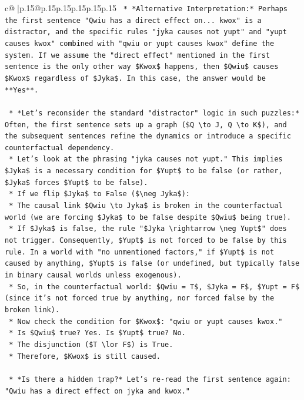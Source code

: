 \documentclass{article}
\begin{document}
{\begin{supertabular}{c@{$\;$}|p{.15\linewidth}@{}p{.15\linewidth}p{.15\linewidth}p{.15\linewidth}p{.15\linewidth}p{.15\linewidth}}
{{{\texttt{        *   *Alternative Interpretation:* Perhaps the first sentence "Qwiu has a direct effect on... kwox" is a distractor, and the specific rules "jyka causes not yupt" and "yupt causes kwox" combined with "qwiu or yupt causes kwox" define the system. If we assume the "direct effect" mentioned in the first sentence is the only other way \$Kwox\$ happens, then \$Qwiu\$ causes \$Kwox\$ regardless of \$Jyka\$. In this case, the answer would be **Yes**.} \\
\\ 
\texttt{    *   *Let's reconsider the standard "distractor" logic in such puzzles:* Often, the first sentence sets up a graph (\$Q \textbackslash{}to J, Q \textbackslash{}to K\$), and the subsequent sentences refine the dynamics or introduce a specific counterfactual dependency.} \\
\texttt{    *   Let's look at the phrasing "jyka causes not yupt." This implies \$Jyka\$ is a necessary condition for \$Yupt\$ to be false (or rather, \$Jyka\$ forces \$Yupt\$ to be false).} \\
\texttt{    *   If we flip \$Jyka\$ to False (\$\textbackslash{}neg Jyka\$):} \\
\texttt{        *   The causal link \$Qwiu \textbackslash{}to Jyka\$ is broken in the counterfactual world (we are forcing \$Jyka\$ to be false despite \$Qwiu\$ being true).} \\
\texttt{        *   If \$Jyka\$ is false, the rule "\$Jyka \textbackslash{}rightarrow \textbackslash{}neg Yupt\$" does not trigger. Consequently, \$Yupt\$ is not forced to be false by this rule. In a world with "no unmentioned factors," if \$Yupt\$ is not caused by anything, \$Yupt\$ is false (or undefined, but typically false in binary causal worlds unless exogenous).} \\
\texttt{        *   So, in the counterfactual world: \$Qwiu = T\$, \$Jyka = F\$, \$Yupt = F\$ (since it's not forced true by anything, nor forced false by the broken link).} \\
\texttt{        *   Now check the condition for \$Kwox\$: "qwiu or yupt causes kwox."} \\
\texttt{        *   Is \$Qwiu\$ true? Yes. Is \$Yupt\$ true? No.} \\
\texttt{        *   The disjunction (\$T \textbackslash{}lor F\$) is True.} \\
\texttt{        *   Therefore, \$Kwox\$ is still caused.} \\
\\ 
\texttt{    *   *Is there a hidden trap?* Let's re{-}read the first sentence again: "Qwiu has a direct effect on jyka and kwox."} \\
}}}
\end{supertabular}}
\end{document}
